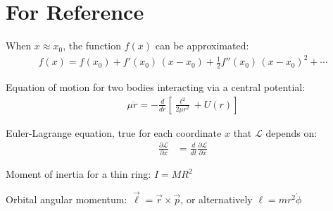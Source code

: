 \documentclass{article}
\begin{document}
\newpage

\section*{For Reference}

When $x \approx x_0$, the function $f(x)$ can be approximated:
\begin{align*}
    f(x) = f(x_0) + f'(x_0) \, (x - x_0) + \tfrac{1}{2} f''(x_0) \, (x - x_0)^2 + \cdots
\end{align*}

Equation of motion for two bodies interacting via a central potential:
\begin{align*}
    \mu \ddot{r} = -\frac{d}{dr} \left[ \frac{\ell^2}{2 \mu r^2} + U(r) \right]
\end{align*}

Euler-Lagrange equation, true for each coordinate $x$ that $\mathcal{L}$ depends on:
\begin{align*}
    \frac{\partial \mathcal{L}}{\partial x} &= \frac{d}{dt} \frac{\partial \mathcal{L}}{\partial \dot{x}}
\end{align*}

Moment of inertia for a thin ring: $I = M R^2$

Orbital angular momentum: $\vec{\ell} = \vec{r} \times \vec{p}$, or alternatively $\ell = m r^2 \dot{\phi}$
\end{document}
